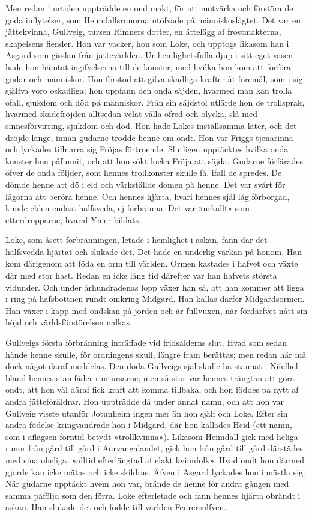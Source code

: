 Men redan i urtiden uppträdde en ond makt, för att motvärka och förstöra
de goda inflytelser, som Heimdallsrunorna utöfvade på människoslägtet.
Det var en jättekvinna, Gullveig, tursen Rimners dotter, en ättelägg af
frostmakterna, skapelsens fiender. Hon var vacker, hon som Loke, och
upptogs likasom han i Asgard som gisslan från jättevärlden. Ur
hemlighetsfulla djup i sitt eget väsen hade hon hämtat ingifvelserna
till de konster, med hvilka hon kom att förföra gudar och människor. Hon
förstod att gifva skadliga krafter åt föremål, som i sig själfva voro
oskadliga; hon uppfann den onda säjden, hvarmed man kan trolla ofall,
sjukdom och död på människor. Från sin säjdstol utlärde hon de
trollspråk,
hvarmed skadefröjden alltsedan velat vålla ofred och olycka, slå med
sinnesförvirring, sjukdom och död. Hon hade Lokes inställsamma later,
och det dröjde länge, innan gudarne trodde henne om ondt. Hon var Friggs
tjenarinna och lyckades tillnarra sig Fröjas förtroende. Slutligen
upptäcktes hvilka onda konster hon påfunnit, och att hon sökt locka
Fröja att säjda. Gudarne förfärades öfver de onda följder, som hennes
trollkonster skulle få, ifall de spredes. De dömde henne att dö i eld
och värkställde domen på henne. Det var svårt för lågorna att beröra
henne. Och hennes hjärta, hvari hennes själ låg förborgad, kunde elden
endast halfsveda, ej förbränna. Det var »urkallt» som etterdropparne,
hvaraf Ymer bildats.

Loke, som åsett förbränningen, letade i hemlighet i askan, fann där det
halfsvedda hjärtat och slukade det. Det hade en underlig värkan på
honom. Han kom därigenom att föda en orm till världen. Ormen kastades i
hafvet och växte där med stor hast. Redan en icke lång tid därefter var
han hafvets största vidunder. Och under århundradenas lopp växer han så,
att han kommer att ligga i ring på hafsbottnen rundt omkring Midgard.
Han kallas därför Midgardsormen. Han växer i kapp med ondskan på jorden
och är fullvuxen, när fördärfvet nått sin höjd och världsförstörelsen
nalkas.

Gullveigs första förbränning inträffade vid fridsålderns slut. Hvad som
sedan hände henne skulle, för ordningens skull, längre fram berättas;
men redan här må dock något däraf meddelas. Den döda Gullveigs själ
skulle ha stannat i Nifelhel bland hennes stamfäder rimtursarne; men så
stor var hennes trängtan att göra ondt, att hon väl däraf fick kraft att
komma tillbaka, och hon föddes på nytt af andra jätteföräldrar. Hon
uppträdde då under annat namn, och att hon var Gullveig visste utanför
Jotunheim ingen mer än hon själf och Loke. Efter sin andra födelse
kringvandrade hon i Midgard, där hon kallades Heid (ett namn, som i
aflägsen forntid betydt »trollkvinna»). Likasom Heimdall gick med heliga
runor från gård till gård i Aurvangalandet, gick hon från gård till gård
därstädes med sina oheliga, »alltid efterlängtad af elakt
kvinnfolk».
Hvad ondt hon därmed gjorde kan icke mätas och icke skildras. Äfven i
Asgard lyckades hon innästla sig. När gudarne upptäckt hvem hon var,
brände de henne för andra gången med samma påföljd som den förra. Loke
efterletade och fann hennes hjärta obrändt i askan. Han slukade det och
födde till världen Fenrersulfven.


